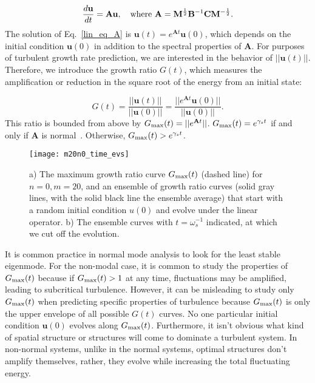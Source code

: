 \documentclass[letter,scriptaddress,twocolumn, prl,showkeys]{revtex4}
\def\beq{\begin{equation}}
\def\eeq{\end{equation}}
\newcommand{\diff}[2]{\frac{d#1}{d#2}}
\begin{document}
\beq
\label{lin_eq_A}
\diff{\mathbf{u}}{t} = \mathbf{A} \mathbf{u},  \quad \rm{where} \ \mathbf{A} = \mathbf{M}^{\frac{1}{2}} \mathbf{B}^{-1} \mathbf{C} \mathbf{M}^{-\frac{1}{2}}.
\eeq
The solution of Eq.~\ref{lin_eq_A} is $\mathbf{u}(t) = e^{\mathbf{A} t} \mathbf{u}(0)$, which
depends on the initial condition $\mathbf{u}(0)$ in addition to the spectral properties of $\mathbf{A}$. For purposes of turbulent growth rate prediction, we are interested in
the behavior of $||\mathbf{u}(t)||$. Therefore, we introduce the growth ratio $G(t)$, which measures the amplification or reduction in the square root of the energy from an initial state:

\beq
\label{g_def}
G(t) = \frac{||\mathbf{u}(t)||}{||\mathbf{u}(0)||} = \frac{||e^{\mathbf{A} t} \mathbf{u}(0)||}{||\mathbf{u}(0)||}.
\eeq
This ratio is bounded from above by $G_{\rm{max}}(t) = ||e^{\mathbf{A} t}||$. $G_{\rm{max}}(t) = e^{\gamma_s t}$ if and only if $\mathbf{A}$ is normal~\cite{schmid2007}. 
Otherwise, $G_{\rm{max}}(t) > e^{\gamma_s t}$. 

\begin{figure}
\centerline{\texttt{[image: m20n0\_time\_evs]}}
\caption{a) The maximum growth ratio curve $G_{\rm{max}}(t)$ (dashed line) for $n=0,m=20$, and an ensemble of growth ratio curves (solid gray lines, with the solid black line the ensemble average)
that start with a random initial condition $u(0)$ and evolve under the linear operator. b) The ensemble curves with $t=\omega_s^{-1}$ indicated, at which we cut off the evolution.}
\label{m20n0_time_evs}
\end{figure}

It is common practice in normal mode analysis to look for the least stable eigenmode. 
For the non-modal case, it is common to study the properties of $G_{\rm{max}}(t)$ because if $G_{\rm{max}}(t) > 1$ at any time, fluctuations may be amplified, leading to subcritical turbulence.
However, it can be misleading to study only $G_{\rm{max}}(t)$ when predicting specific properties of turbulence because
$G_{\rm{max}}(t)$ is only the upper envelope of all possible $G(t)$ curves. No one particular initial condition $\mathbf{u}(0)$ evolves along $G_{\rm{max}}(t)$. 
Furthermore, it isn't obvious what kind of spatial structure or structures will come to dominate a turbulent system.
In non-normal systems, unlike in the normal systems, optimal structures don't amplify themselves, rather, they evolve while increasing the total fluctuating energy.
\end{document}
